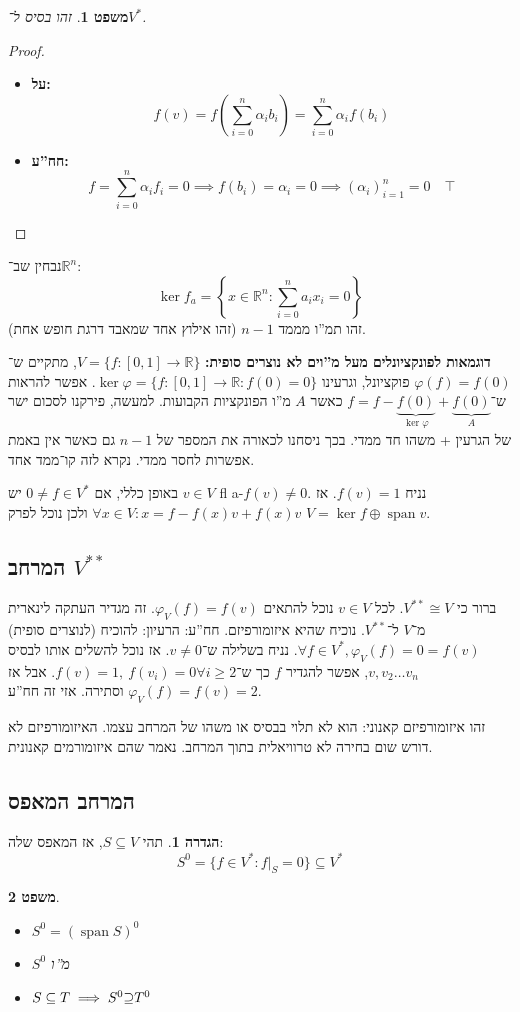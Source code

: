 \documentclass[]{article}
\newcommand\R     {\mathbb{R}}
\DeclareMathOperator{\Sp}     {span}
\newcommand\sumni     {\sum_{i = 0}^{n}}
\newcommand\co        {\colon}
\newcommand\ag        {\alpha}
\newcommand\cl [1]    {\left ( #1 \right )}
\newcommand\ccb[1]    {\left \{ #1 \right \}}
\renewcommand\phi     {\varphi}
\newtheorem{Theorem}{משפט}
\theoremstyle{definition}
\newtheorem{definition}{הגדרה}
\newcommand\theo  [1] {\begin{Theorem}#1\end{Theorem}}
\newcommand\defi  [1] {\begin{definition}#1\end{definition}}
\begin{document}
    \theo{זהו בסיס ל־$V^*$. }\begin{proof}\,
        \begin{itemize}
            \item \textbf{על: }
            \[ f(v) = f\cl{\sumni \ag_i b_i} = \sumni \ag_i f(b_i) \]
            \item \textbf{חח''ע: }
            \[ f = \sumni \ag_i f_i = 0 \implies f(b_i) = \ag_i = 0 \implies (\ag_i)_{i = 1}^{n} = 0 \quad \top \]
        \end{itemize}
    \end{proof}
    נבחין שב־$\R^{n}$: 
    \[ \ker f_a = \ccb{x \in \R^n \co \sumni a_ix_i = 0} \]
    זהו תמ''ו מממד $n - 1$ (זהו אילוץ אחד שמאבד דרגת חופש אחת). 
    
    \textbf{דוגמאות לפונקציונלים מעל מ''וים לא נוצרים סופית: }$V = \{f \co [0, 1] \to \R\}$, מתקיים ש־$\phi(f) = f(0)$ פוקציונל, וגרעינו $\ker \phi =\{f \co [0, 1] \to \R\co f(0) = 0\}$. אפשר להראות ש־$f = f - \underbrace{f(0)}_{\ker \phi} + \underbrace{f(0)}_{A}$ כאשר $A$ מ''ו הפונקציות הקבועות. למעשה, פירקנו לסכום ישר של הגרעין + משהו חד ממדי. בכך ניסחנו לכאורה את המספר של $n - 1$ גם כאשר אין באמת אפשרות לחסר ממדי. נקרא לזה קו־ממד אחד. 
    
    באופן כללי, אם $0 \neq f \in V^*$ יש $v \in V$ fl a-$f(v) \neq 0$. נניח $f(v) = 1$. אז $\forall x \in V \co x = f - f(x)v + f(x) v$ ולכן נוכל לפרק $V = \ker f \oplus \Sp v$. 
    
    \subsection*{המרחב $V^{**}$}
    ברור כי $V^{**}\cong V$. לכל $v \in V$ נוכל להתאים $\phi_V(f) = f(v)$. זה מגדיר העתקה לינארית מ־$V$ ל־$V^{**}$. נוכיח שהיא איזומורפיזם. חח''ע: הרעיון: להוכיח (לנוצרים סופית) $\forall f \in V^*, \phi_V(f) =  0 = f(v)$. נניח בשלילה ש־$v \neq 0$. אז נוכל להשלים אותו לבסיס $v, v_2 \dots v_n$, אפשר להגדיר $f$ כך ש־$f(v) = 1, \ f(v_i) = 0 \forall i \ge 2$. אבל אז $\phi_V(f) = f(v) = 2$ וסתירה. אזי זה חח''ע. 
    
    
    זהו איזומורפיזם קאנוני: הוא לא תלוי בבסיס או משהו של המרחב עצמו. האיזומורפיזם לא דורש שום בחירה לא טרוויאלית בתוך המרחב. נאמר שהם איזומורמים קאנונית. 
    
    \subsection*{המרחב המאפס}
    \defi{תהי $S \subseteq V$, אז המאפס שלה: 
    \[ S^{0} = \{f \in V^* \co f|_S = 0\}\subseteq V^* \]}
    \theo{\,
    \begin{itemize}
        \item \hfil $S^0 = (\Sp S)^0$
        \item $S^0$ מ''ו
        \item \hfil $S \subseteq T \implies S^0 \reflectbox{$\subseteq$} T^0$
    \end{itemize}}
\end{document}
